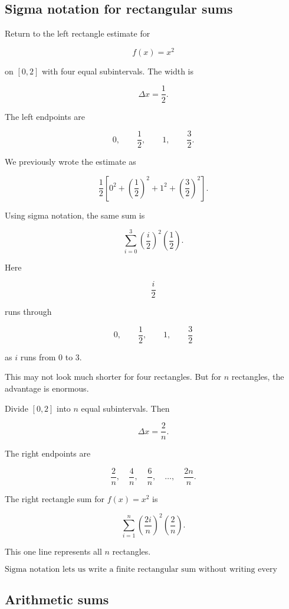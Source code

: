 \subsection{Sigma notation for rectangular sums}
\label{subsec:sigma-notation-rectangular-sums}

Return to the left rectangle estimate for

\[
f(x)=x^2
\]

on \([0,2]\) with four equal subintervals.  The width is

\[
\Delta x=\frac12.
\]

The left endpoints are

\[
0,\qquad \frac12,\qquad 1,\qquad \frac32.
\]

We previously wrote the estimate as

\[
\frac12\left[
0^2+\left(\frac12\right)^2+1^2+\left(\frac32\right)^2
\right].
\]

Using sigma notation, the same sum is

\[
\sum_{i=0}^{3}
\left(\frac{i}{2}\right)^2
\left(\frac12\right).
\]

Here

\[
\frac{i}{2}
\]

runs through

\[
0,\qquad \frac12,\qquad 1,\qquad \frac32
\]

as \(i\) runs from \(0\) to \(3\).

This may not look much shorter for four rectangles.  But for \(n\) rectangles, the
advantage is enormous.

Divide \([0,2]\) into \(n\) equal subintervals.  Then

\[
\Delta x=\frac{2}{n}.
\]

The right endpoints are

\[
\frac{2}{n},\quad \frac{4}{n},\quad \frac{6}{n},\quad \ldots,\quad \frac{2n}{n}.
\]

The right rectangle sum for \(f(x)=x^2\) is

\[
\sum_{i=1}^{n}
\left(\frac{2i}{n}\right)^2
\left(\frac{2}{n}\right).
\]

This one line represents all \(n\) rectangles.

\[
\boxed{
\text{Sigma notation lets us write a finite rectangular sum without writing every rectangle.}
}
\]

\subsection{Arithmetic sums}
\label{subsec:arithmetic-sums}

